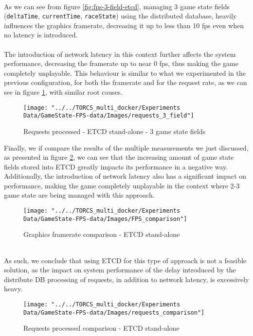 \\ As we can see from figure \ref{fig:fps-3-field-etcd}, managing 3 game state fields (\texttt{deltaTime}, \texttt{currentTime}, \texttt{raceState}) using the distributed database, heavily influences the graphics framerate, decreasing it up to less than 10 fps even when no latency is introduced. \\ \\
The introduction of network latency in this context further affects the system performance, decreasing the framerate up to near 0 fps, thus making the game completely unplayable. This behaviour is similar to what we experimented in the previous configuration, for both the framerate and for the request rate, as we can see in figure \ref{fig:requests-3-field-etcd}, with similar root causes.
\begin{figure}[h!]
	\centering
	\texttt{[image: "../../TORCS\_multi\_docker/Experiments Data/GameState-FPS-data/Images/requests\_3\_field"]}
	\caption[Requests processed - ETCD stand-alone - 3 game state fields]{Requests processed - ETCD stand-alone - 3 game state fields}
	\label{fig:requests-3-field-etcd}
\end{figure}
Finally, we if compare the results of the multiple measurements we just discussed, as presented in figure \ref{fig:fps-comparison-etcd}, we can see that the increasing amount of game state fields stored into ETCD greatly impacts its performance in a negative way. Additionally, the introduction of network latency also has a significant impact on performance, making the game completely unplayable in the context where 2-3 game state are being managed with this approach. \\ 
\begin{figure}[h!]
	\centering
	\texttt{[image: "../../TORCS\_multi\_docker/Experiments Data/GameState-FPS-data/Images/FPS\_comparison"]}
	\caption[Graphics framerate comparison - ETCD stand-alone]{Graphics framerate comparison - ETCD stand-alone}
	\label{fig:fps-comparison-etcd}
\end{figure}
\\ As such, we conclude that using ETCD for this type of approach is not a feasible solution, as the impact on system performance of the delay introduced by the distribute DB processing of requests, in addition to network latency, is excessively heavy.
\begin{figure}[h!]
	\centering
	\texttt{[image: "../../TORCS\_multi\_docker/Experiments Data/GameState-FPS-data/Images/requests\_comparison"]}
	\caption[Requests processed comparison - ETCD stand-alone]{Requests processed comparison - ETCD stand-alone}
	\label{fig:requests-comparison-etcd}
\end{figure}

